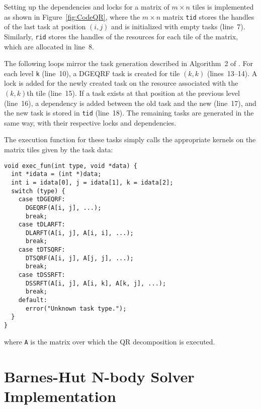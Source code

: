 \documentclass[preprint]{elsarticle}
\newcommand{\fig}[1]
    {Figure~\ref{fig:#1}}
\begin{document}
Setting up the dependencies and locks for a matrix of
$m\times n$ tiles is implemented as shown in \fig{CodeQR},
where the $m\times n$ matrix {\tt tid} stores the handles
of the last task at position $(i,j)$ and is initialized with
empty tasks (line~7).
Similarly, {\tt rid} stores the handles of the resources for each
tile of the matrix, which are allocated in line~8.

The following loops mirror the task generation described in
Algorithm~2 of \cite{ref:Buttari2009}.
For each level {\tt k} (line~10), a DGEQRF task is created
for tile $(k,k)$ (lines~13--14).
A lock is added for the newly created task on the
resource associated with the $(k,k)$th tile (line~15).
If a task exists at that position at the previous level
(line~16), a dependency is added between the old task and
the new (line~17), and the new task is stored in {\tt tid}
(line~18).
The remaining tasks are generated in the same way, with
their respective locks and dependencies.

The execution function for these tasks simply calls the appropriate
kernels on the matrix tiles given by the task data:
\begin{center}\begin{minipage}{0.9\textwidth}
    \begin{lstlisting}
void exec_fun(int type, void *data) {
  int *idata = (int *)data;
  int i = idata[0], j = idata[1], k = idata[2];
  switch (type) {
    case tDGEQRF:
      DGEQRF(A[i, j], ...);
      break;
    case tDLARFT:
      DLARFT(A[i, j], A[i, i], ...);
      break;
    case tDTSQRF:
      DTSQRF(A[i, j], A[j, j], ...);
      break;
    case tDSSRFT:
      DSSRFT(A[i, j], A[i, k], A[k, j], ...);
      break;
    default:
      error("Unknown task type.");
  }
}
    \end{lstlisting}
\end{minipage}\end{center}
\noindent where {\tt A} is the matrix over which the QR
decomposition is executed.


\section{Barnes-Hut N-body Solver Implementation}
\end{document}
